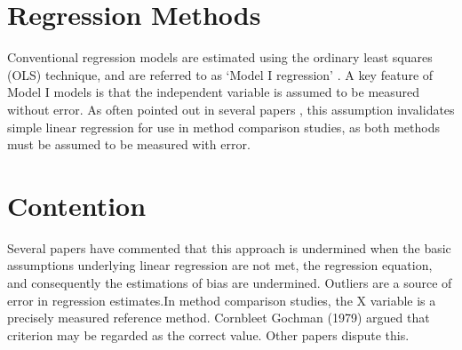 \documentclass[12pt, a4paper]{report}
\theoremstyle{plain}
\theoremstyle{definition}
\theoremstyle{remark}
\begin{document}





\section{Regression Methods}
	Conventional regression models are estimated using the ordinary
	least squares (OLS) technique, and are referred to as `Model I
	regression' \citep{CornCoch,ludbrook97}. A key feature of Model I
	models is that the independent variable is assumed to be measured
	without error. As often pointed out in several papers
	\citep{BA83,ludbrook97}, this assumption invalidates simple linear
	regression for use in method comparison studies, as both methods
	must be assumed to be measured with error.
	





	


\section{Contention }
Several papers have commented that this approach is undermined
when the basic assumptions underlying linear regression are not
met, the regression equation, and consequently the estimations of
bias are undermined. Outliers are a source of error in regression
estimates.In method comparison studies, the X variable is a
precisely measured reference method. Cornbleet Gochman (1979)
argued that criterion may be regarded as the correct value. Other
papers dispute this.
\end{document}
